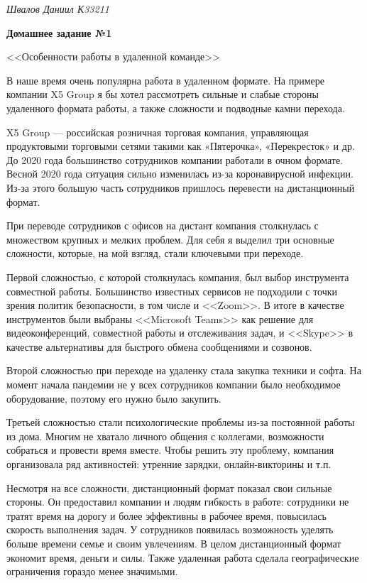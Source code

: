 \documentclass[a4paper, 14pt]{extarticle}
\begin{document}
\begin{flushright}
  \textit{Швалов Даниил К33211}
\end{flushright}

\begin{center}
  \bfseries
  Домашнее задание №1

  <<Особенности работы в удаленной команде>>
\end{center}

В наше время очень популярна работа в удаленном формате. На примере компании X5
Group я бы хотел рассмотреть сильные и слабые стороны удаленного формата
работы, а также сложности и подводные камни перехода.

X5 Group — российская розничная торговая компания, управляющая продуктовыми
торговыми сетями такими как «Пятерочка», «Перекресток» и др. До 2020 года
большинство сотрудников компании работали в очном формате. Весной 2020 года
ситуация сильно изменилась из-за коронавирусной инфекции. Из-за этого большую
часть сотрудников пришлось перевести на дистанционный формат.

При переводе сотрудников с офисов на дистант компания столкнулась с множеством
крупных и мелких проблем. Для себя я выделил три основные сложности, которые,
на мой взгляд, стали ключевыми при переходе.

Первой сложностью, с которой столкнулась компания, был выбор инструмента
совместной работы. Большинство известных сервисов не подходили с точки зрения
политик безопасности, в том числе и <<Zoom>>. В итоге в качестве инструментов
были выбраны <<Microsoft Teams>> как решение для видеоконференций, совместной
работы и отслеживания задач, и <<Skype>> в качестве альтернативы для быстрого
обмена сообщениями и созвонов.

Второй сложностью при переходе на удаленку стала закупка техники и софта. На
момент начала пандемии не у всех сотрудников компании было необходимое
оборудование, поэтому его нужно было закупить.

Третьей сложностью стали психологические проблемы из-за постоянной работы из
дома. Многим не хватало личного общения с коллегами, возможности собраться и
провести время вместе. Чтобы решить эту проблему, компания организовала ряд
активностей: утренние зарядки, онлайн-викторины и т.п.

Несмотря на все сложности, дистанционный формат показал свои сильные стороны.
Он предоставил компании и людям гибкость в работе: сотрудники не тратят время
на дорогу и более эффективны в рабочее время, повысилась скорость выполнения
задач. У сотрудников появилась возможность уделять больше времени семье и своим
увлечениям. В целом дистанционный формат экономит время, деньги и силы. Также
удаленная работа сделала географические ограничения гораздо менее значимыми.
\end{document}
